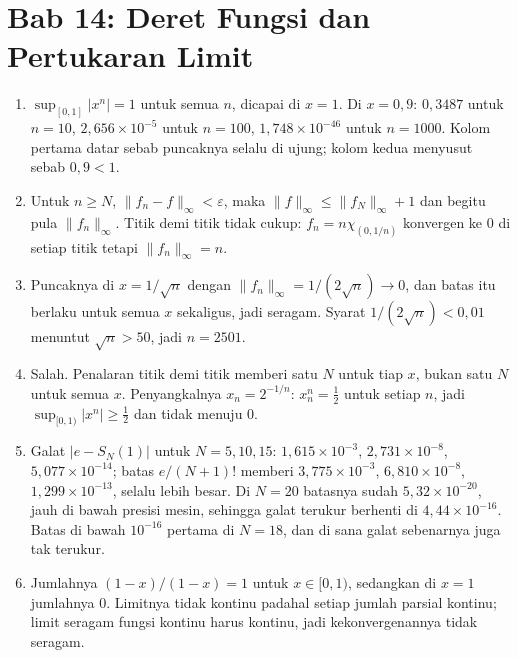 \section*{Bab 14: Deret Fungsi dan Pertukaran Limit}
\begin{enumerate}[label=\textbf{14.\arabic*}]
  \item $\sup_{[0,1]}\lvert x^{n}\rvert=1$ untuk semua $n$, dicapai di $x=1$.
        Di $x=0{,}9$: $0{,}3487$ untuk $n=10$, $2{,}656\times10^{-5}$ untuk
        $n=100$, $1{,}748\times10^{-46}$ untuk $n=1000$. Kolom pertama datar
        sebab puncaknya selalu di ujung; kolom kedua menyusut sebab $0{,}9<1$.

  \item Untuk $n\ge N$, $\lVert f_{n}-f\rVert_{\infty}<\varepsilon$, maka
        $\lVert f\rVert_{\infty}\le\lVert f_{N}\rVert_{\infty}+1$ dan begitu
        pula $\lVert f_{n}\rVert_{\infty}$. Titik demi titik tidak cukup:
        $f_{n}=n\chi_{(0,1/n)}$ konvergen ke $0$ di setiap titik tetapi
        $\lVert f_{n}\rVert_{\infty}=n$.

  \item Puncaknya di $x=1/\sqrt n$ dengan
        $\lVert f_{n}\rVert_{\infty}=1/(2\sqrt n)\to0$, dan batas itu berlaku
        untuk semua $x$ sekaligus, jadi seragam. Syarat
        $1/(2\sqrt n)<0{,}01$ menuntut $\sqrt n>50$, jadi $n=2501$.

  \item Salah. Penalaran titik demi titik memberi satu $N$ untuk tiap $x$, bukan
        satu $N$ untuk semua $x$. Penyangkalnya $x_{n}=2^{-1/n}$:
        $x_{n}^{n}=\tfrac12$ untuk setiap $n$, jadi
        $\sup_{[0,1)}\lvert x^{n}\rvert\ge\tfrac12$ dan tidak menuju $0$.

  \item Galat $\lvert e-S_{N}(1)\rvert$ untuk $N=5,10,15$:
        $1{,}615\times10^{-3}$, $2{,}731\times10^{-8}$,
        $5{,}077\times10^{-14}$; batas $e/(N+1)!$ memberi
        $3{,}775\times10^{-3}$, $6{,}810\times10^{-8}$,
        $1{,}299\times10^{-13}$, selalu lebih besar. Di $N=20$ batasnya sudah
        $5{,}32\times10^{-20}$, jauh di bawah presisi mesin, sehingga galat
        terukur berhenti di $4{,}44\times10^{-16}$. Batas di bawah $10^{-16}$
        pertama di $N=18$, dan di sana galat sebenarnya juga tak terukur.

  \item Jumlahnya $(1-x)/(1-x)=1$ untuk $x\in[0,1)$, sedangkan di $x=1$
        jumlahnya $0$. Limitnya tidak kontinu padahal setiap jumlah parsial
        kontinu; limit seragam fungsi kontinu harus kontinu, jadi
        kekonvergenannya tidak seragam.


\end{enumerate}
